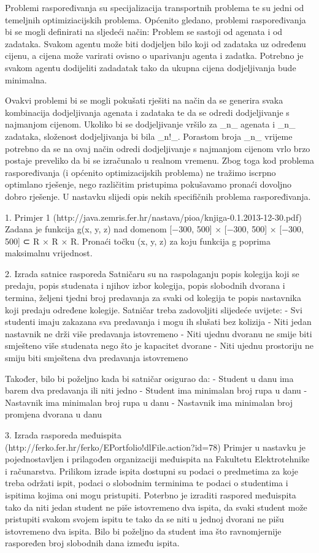 Problemi raspoređivanja su specijalizacija transportnih problema te su jedni od temeljnih optimiziacijskih problema.
Općenito gledano, problemi raspoređivanja bi se mogli definirati na sljedeći način:
Problem se sastoji od agenata i od zadataka. Svakom agentu može biti dodjeljen bilo koji od zadataka uz određenu cijenu, a cijena
može varirati ovisno o uparivanju agenta i zadatka. Potrebno je svakom agentu dodijeliti zadadatak tako da ukupna cijena dodjeljivanja
bude minimalna.

Ovakvi problemi bi se mogli pokušati rješiti na način da se generira svaka kombinacija dodjeljivanja agenata i zadataka te da se
odredi dodjeljivanje s najmanjom cijenom. Ukoliko bi se dodjeljivanje vršilo za _n_ agenata i _n_ zadataka, složenost dodjeljivanja bi bila
_n!_. Porastom broja _n_ vrijeme potrebno da se na ovaj način odredi dodjeljivanje s najmanjom cijenom vrlo brzo postaje preveliko da bi se
izračunalo u realnom vremenu. Zbog toga kod problema raspoređivanja (i općenito optimizacijskih problema) ne tražimo iscrpno optimlano rješenje,
nego različitim pristupima pokušavamo pronaći dovoljno dobro rješenje. U nastavku slijedi opis nekih specifičnih problema raspoređivanja.

1. Primjer 1 (http://java.zemris.fer.hr/nastava/pioa/knjiga-0.1.2013-12-30.pdf)
Zadana je funkcija g(x, y, z) nad domenom [−300, 500] × [−300, 500] × [−300, 500] ⊂
R × R × R. Pronaći točku (x, y, z) za koju funkcija g poprima maksimalnu vrijednost.

2. Izrada satnice rasporeda
Satničaru su na raspolaganju popis kolegija koji se predaju, popis studenata i njihov izbor kolegija, popis slobodnih dvorana i termina,
željeni tjedni broj predavanja za svaki od kolegija te popis nastavnika koji predaju određene kolegije. Satničar treba zadovoljiti
slijedeće uvijete:
  - Svi studenti imaju zakazana sva predavanja i mogu ih slušati bez kolizija
  - Niti jedan nastavnik ne drži više predavanja istovremeno
  - Niti ujednu dvoranu ne smije biti smješteno više studenata nego što je kapacitet dvorane
  - Niti ujednu prostoriju ne smiju biti smještena dva predavanja istovremeno

Također, bilo bi poželjno kada bi satničar osigurao da:
  - Student u danu ima barem dva predavanja ili niti jedno
  - Student ima minimalan broj rupa u danu
  - Nastavnik ima minimalan broj rupa u danu
  - Nastavnik ima minimalan broj promjena dvorana u danu



3. Izrada rasporeda međuispita (http://ferko.fer.hr/ferko/EPortfolio!dlFile.action?id=78)
Primjer u nastavku je pojednostavljen i prilagođen organizaciji međuispita na Fakultetu Elektrotehnike i računarstva.
Prilikom izrade ispita dostupni su podaci o predmetima za koje treba održati ispit, podaci o slobodnim terminima te
podaci o studentima i ispitima kojima oni mogu pristupiti. Poterbno je izraditi raspored međuispita tako da niti jedan
student ne piše istovremeno dva ispita, da svaki student može pristupiti svakom svojem ispitu
te tako da se niti u jednoj dvorani ne pišu istovremeno dva ispita. Bilo bi poželjno
da student ima što ravnomjernije raspoređen broj slobodnih dana između ispita.




